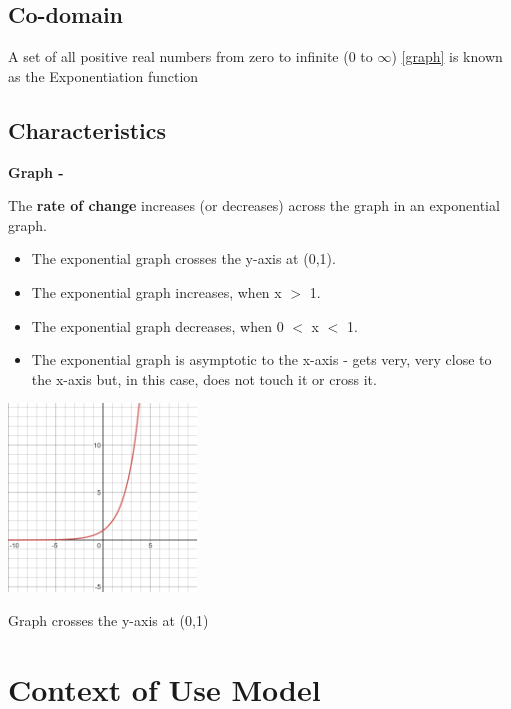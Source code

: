 \documentclass[a4paper, 11pt]{report}
\begin{document}
\subsection*{Co-domain}
A set of all positive real numbers from zero to infinite (0 to \(\infty\))
\ref{graph} is known as the Exponentiation function

\subsection*{Characteristics}
\begin{flushleft}
\textbf{Graph - }
 \end{flushleft}
\begin{flushleft}
\cite{mathbits}\cite{wolframalpha} The \textbf{rate of change} increases (or decreases) across the graph in an exponential graph.
\end{flushleft}
\begin{itemize}
\item \label{graph} The exponential graph crosses the y-axis at (0,1). 
\item The exponential graph increases, when x \(>\) 1.
\item The exponential graph decreases, when 0 \(<\) x \(<\) 1.
\item The exponential graph is asymptotic to the x-axis - gets very, very close to the x-axis but, in this case, does not touch it or cross it.
\end{itemize}
\begin{center}
\includegraphics[width=5cm]{x^y}
\end{center}
\begin{center}
Graph crosses the y-axis at (0,1)\end{center}
\printbibliography
\newpage
{}
\section*{Context of Use Model}
\end{document}
